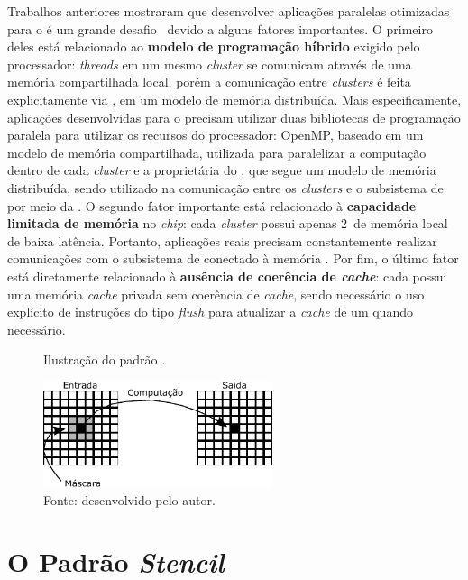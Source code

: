 Trabalhos anteriores mostraram que desenvolver aplicações paralelas otimizadas
para o \mppa é um grande desafio~\cite{Castro-IA3-JPDC:2014} devido a alguns
fatores importantes. O primeiro deles está relacionado ao \textbf{modelo de
    programação híbrido} exigido pelo processador: \textit{threads} em um mesmo
\textit{cluster} se comunicam através de uma memória compartilhada local, porém
a comunicação entre \textit{clusters} é feita explicitamente via \noc, em um
modelo de memória distribuída. Mais especificamente, aplicações desenvolvidas
para o \mppa precisam utilizar duas bibliotecas de programação paralela para
utilizar os recursos do processador: OpenMP, baseado em um modelo de memória
compartilhada, utilizada para paralelizar a computação dentro de cada
\textit{cluster} e a \api proprietária do \mppa, que segue um modelo de memória
distribuída, sendo utilizado na comunicação entre os \textit{clusters} e o
subsistema de \es por meio da \noc. O segundo fator importante está relacionado
à \textbf{capacidade limitada de memória} no \textit{chip}: cada \textit{cluster}
possui apenas 2~\mb de memória local de baixa latência. Portanto, aplicações
reais precisam constantemente realizar comunicações com o subsistema de \es
conectado à memória \lpddr. Por fim, o último fator está diretamente relacionado
à \textbf{ausência de coerência de \textit{cache}}: cada \pe possui uma memória
\textit{cache} privada sem coerência de \textit{cache}, sendo necessário o uso
explícito de instruções do tipo \textit{flush} para atualizar a \textit{cache}
de um \pe quando necessário.


\begin{figure}[t]
	\centering
	\caption{Ilustração do padrão \stencil.}
	\includegraphics[width=0.6\textwidth]{figs/stencilComp.pdf}
    \caption*{Fonte: desenvolvido pelo autor.}
	\label{fig:stencil}
\end{figure}

\section{O Padrão \textit{Stencil}}
\label{sec:stencil}

